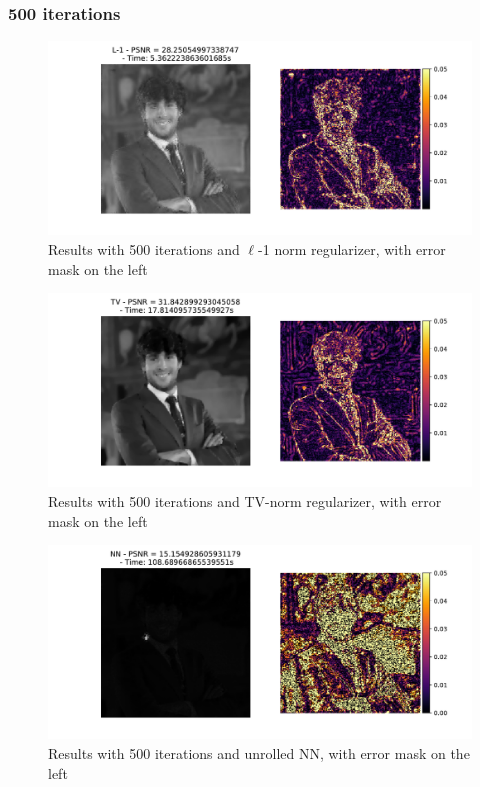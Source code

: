 \documentclass[12pt]{article}
\begin{document}
\subsubsection{500 iterations}
\begin{figure}
    \centering
    \includegraphics[width=12cm]{hw3/codes/exercise2/results/comparisons/me_comparison_l1_500.pdf}
    \caption{Results with 500 iterations and $\ell$-1 norm regularizer, with error mask on the left}
    \label{fig:comparison-l1-500}
\end{figure}

\begin{figure}
    \centering
    \includegraphics[width=12cm]{hw3/codes/exercise2/results/comparisons/me_comparison_tv_500.pdf}
    \caption{Results with 500 iterations and TV-norm regularizer, with error mask on the left}
    \label{fig:comparison-tv-500}
\end{figure}

\begin{figure}
    \centering
    \includegraphics[width=12cm]{hw3/codes/exercise2/results/comparisons/me_comparison_nn_500.pdf}
    \caption{Results with 500 iterations and unrolled NN, with error mask on the left}
    \label{fig:comparison-nn-500}
\end{figure}
\end{document}
